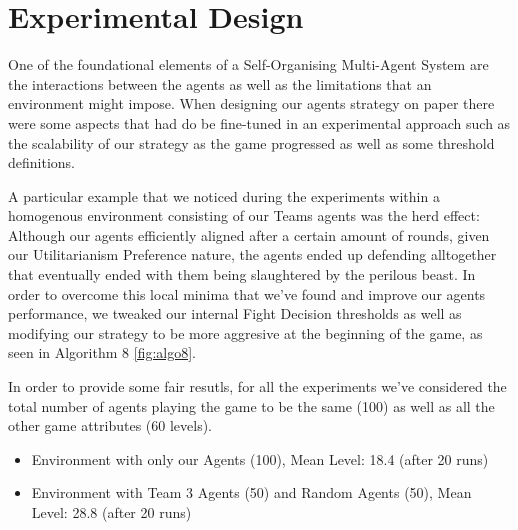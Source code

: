 


\section{Experimental Design}

One of the foundational elements of a Self-Organising Multi-Agent System are the interactions between the agents as well as the limitations that an environment might impose. When designing our agents strategy on paper there were some aspects that had do be fine-tuned in an experimental approach such as the scalability of our strategy as the game progressed as well as some threshold definitions.

A particular example that we noticed during the experiments within a homogenous environment consisting of our Teams agents was the herd effect: Although our agents efficiently aligned after a certain amount of rounds, given our Utilitarianism Preference nature, the agents ended up defending alltogether that eventually ended with them being slaughtered by the perilous beast. In order to overcome this local minima that we've found and improve our agents performance, we tweaked our internal Fight Decision thresholds as well as modifying our strategy to be more aggresive at the beginning of the game, as seen in Algorithm 8 \ref{fig:algo8}.


In order to provide some fair resutls, for all the experiments we've considered the total number of agents playing the game to be the same (100) as well as all the other game attributes (60 levels).
\begin{itemize}
    \item Environment with only our Agents (100), Mean Level: 18.4 (after 20 runs)
    \item Environment with Team 3 Agents (50) and Random Agents (50), Mean Level: 28.8 (after 20 runs)
\end{itemize}

